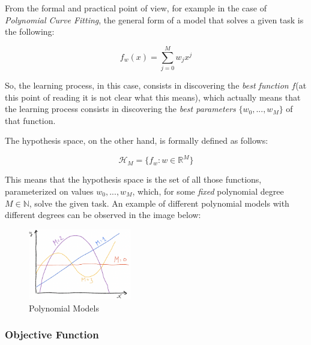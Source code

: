 \newpage

From the formal and practical point of view, for example in the case of
\emph{Polynomial Curve Fitting}, the general form of a model that solves a given
task is the following:

\begin{equation*}
      f_w(x) = \sum_{j = 0}^{M} w_jx^j
\end{equation*}

So, the learning process, in this case, consists in discovering the
\emph{best function} $f$(at this point of reading it is not clear what this means),
which actually means that the learning process consists in discovering the
\emph{best parameters} $\{w_0,...,w_M\}$ of that function.

The hypothesis space, on the other hand, is formally defined as follows:

\begin{equation*}
      \mathcal{H}_M = \{f_w : w \in \mathbb{R}^M\}
\end{equation*}

This means that the hypothesis space is the set of all those functions, parameterized on
values $w_0,...,w_M$, which, for some \emph{fixed} polynomial degree $M \in \mathbb{N}$,
solve the given task. An example of different polynomial models with different degrees
can be observed in the image below:

\begin{figure}[h]
      \centering
      \includegraphics[width=0.4\textwidth]{../img/Polynomial_models}
      \caption{Polynomial Models}
\end{figure}

\subsubsection{Objective Function}